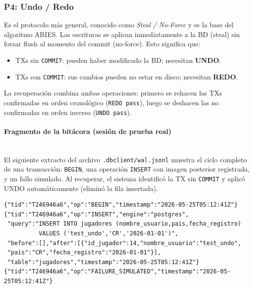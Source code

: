 \documentclass[12pt,letterpaper]{article}
\begin{document}
\subsubsection{P4: \textbf{Undo / Redo}}

Es el protocolo más general, conocido como \textit{Steal / No-Force} y es la base del
algoritmo ARIES. Las escrituras se aplican inmediatamente a la BD (steal) sin forzar flush
al momento del commit (no-force). Esto significa que:

\begin{itemize}
  \item TXs sin \texttt{COMMIT}: pueden haber modificado la BD; necesitan \textbf{UNDO}.
  \item TXs con \texttt{COMMIT}: sus cambios pueden no estar en disco; necesitan \textbf{REDO}.
\end{itemize}

La recuperación combina ambas operaciones: primero se rehacen las TXs confirmadas en orden
cronológico (\texttt{REDO pass}), luego se deshacen las no confirmadas en orden inverso
(\texttt{UNDO pass}).

\paragraph{Fragmento de la bitácora (sesión de prueba real)}\mbox{}\\

El siguiente extracto del archivo \texttt{.dbclient/wal.jsonl} muestra el ciclo completo de
una transacción: \texttt{BEGIN}, una operación \texttt{INSERT} con imagen posterior registrada,
y un fallo simulado. Al recuperar, el sistema identificó la TX sin \texttt{COMMIT} y aplicó
UNDO automáticamente (eliminó la fila insertada).

\begin{lstlisting}[style=jsoncode, caption={Extracto real del WAL — ciclo BEGIN/INSERT/FAILURE\_SIMULATED con recuperación UNDO}]
{"tid":"T246946a6","op":"BEGIN","timestamp":"2026-05-25T05:12:41Z"}
{"tid":"T246946a6","op":"INSERT","engine":"postgres",
 "query":"INSERT INTO jugadores (nombre_usuario,pais,fecha_registro)
          VALUES ('test_undo','CR','2026-01-01')",
 "before":[],"after":[{"id_jugador":14,"nombre_usuario":"test_undo",
 "pais":"CR","fecha_registro":"2026-01-01"}],
 "table":"jugadores","timestamp":"2026-05-25T05:12:41Z"}
{"tid":"T246946a6","op":"FAILURE_SIMULATED","timestamp":"2026-05-25T05:12:41Z"}
\end{lstlisting}
\end{document}
